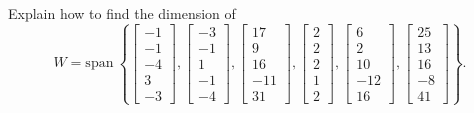 \documentclass{article}
\begin{document}
\begin{exerciseStatement}
    Explain how to find the dimension of
\[W=\mathrm{span}\ \left\{\left[\begin{array}{r}
-1 \\
-1 \\
-4 \\
3 \\
-3
\end{array}\right] , \left[\begin{array}{r}
-3 \\
-1 \\
1 \\
-1 \\
-4
\end{array}\right] , \left[\begin{array}{r}
17 \\
9 \\
16 \\
-11 \\
31
\end{array}\right] , \left[\begin{array}{r}
2 \\
2 \\
2 \\
1 \\
2
\end{array}\right] , \left[\begin{array}{r}
6 \\
2 \\
10 \\
-12 \\
16
\end{array}\right] , \left[\begin{array}{r}
25 \\
13 \\
16 \\
-8 \\
41
\end{array}\right]\right\}.\]



  
\end{exerciseStatement}
\end{document}
